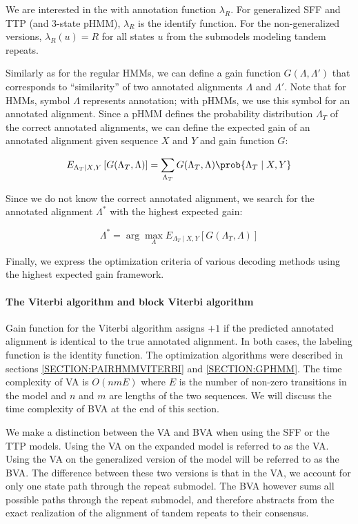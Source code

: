 We are interested in the  with annotation
function $\lambda_R$.  For generalized SFF and TTP (and 3-state pHMM),
$\lambda_R$ is the identify function. For the non-generalized versions,
$\lambda_R(u)=R$ for all states $u$ from the submodels modeling tandem repeats.

Similarly as for the regular HMMs, we can define a gain function $G(\Lambda,
\Lambda')$ that corresponds to ``similarity'' of two annotated alignments
$\Lambda$ and $\Lambda'$. Note that for HMMs, symbol $\Lambda$ represents
annotation; with pHMMs, we use this symbol for an annotated alignment.  Since a
pHMM defines the probability distribution $\Lambda_T$ of the correct annotated
alignments, we can define the expected gain of an annotated alignment given
sequence $X$ and $Y$ and gain function $G$: 

\begin{equation}
E_{\Lambda_T\mid X, Y}\left[G(\Lambda_T, \Lambda)\right] = 
\sum_{\Lambda_T}G(\Lambda_T, \Lambda)\prob{\Lambda_T\mid X, Y}
\end{equation}

Since we do not know the correct annotated alignment, we search for the
annotated alignment $\Lambda^*$ with the highest expected gain:

\begin{equation}
\Lambda^* = \arg\max_{\Lambda}
E_{\Lambda_T\mid X, Y}\left[G(\Lambda_T, \Lambda)\right]
\end{equation}

Finally, we express the optimization criteria of various decoding methods using
the highest expected gain framework.

\paragraph{The Viterbi algorithm and block Viterbi algorithm} Gain function for
the Viterbi algorithm assigns $+1$ if the predicted annotated alignment is
identical to the true annotated alignment. In both cases, the labeling function
is the identity function. The optimization algorithms were described in
sections \ref{SECTION:PAIRHMMVITERBI} and \ref{SECTION:GPHMM}. The time
complexity of VA is $O(nmE)$ where $E$ is the number of non-zero transitions in
the model and $n$ and $m$ are lengths of the two sequences. We will discuss the
time complexity of BVA at the end of this section.

We make a distinction between the VA and BVA when using the SFF or the TTP
models. Using the VA on the expanded model is referred to as the VA. Using the
VA on the generalized version of the model will be referred to as the BVA. The
difference between these two versions is that in the VA, we account for only
one state path through the repeat submodel. The BVA however sums all possible
paths through the repeat submodel, and therefore abstracts from the exact
realization of the alignment of tandem repeats to their consensus.

